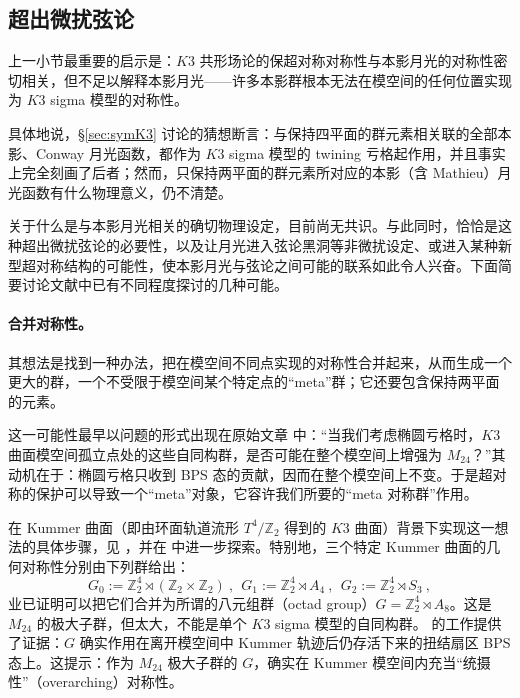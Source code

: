 \documentclass[11pt,a4paper,fontset=windows]{ctexart}
\numberwithin{equation}{section}
\newcommand{\myparagraph}[1]{\paragraph{#1}\mbox\\}
\newcommand{\ZZ}{\mathbb{Z}}
\begin{document}

\subsection{超出微扰弦论}
\label{subsec:phys_Other directions}

上一小节最重要的启示是：$K3$ 共形场论的保超对称对称性与本影月光的对称性密切相关，但不足以解释本影月光——许多本影群根本无法在模空间的任何位置实现为 $K3$ sigma 模型的对称性。

具体地说，\S\ref{sec:symK3} 讨论的猜想断言：与保持四平面的群元素相关联的全部本影、Conway 月光函数，都作为 $K3$ sigma 模型的 twining 亏格起作用，并且事实上完全刻画了后者；然而，只保持两平面的群元素所对应的本影（含 Mathieu）月光函数有什么物理意义，仍不清楚。


关于什么是与本影月光相关的确切物理设定，目前尚无共识。与此同时，恰恰是这种超出微扰弦论的必要性，以及让月光进入弦论黑洞等非微扰设定、或进入某种新型超对称结构的可能性，使本影月光与弦论之间可能的联系如此令人兴奋。下面简要讨论文献中已有不同程度探讨的几种可能。

\myparagraph{合并对称性。} 其想法是找到一种办法，把在模空间不同点实现的对称性合并起来，从而生成一个更大的群，一个不受限于模空间某个特定点的“meta”群；它还要包含保持两平面的元素。

这一可能性最早以问题的形式出现在原始文章 \cite{Eguchi2010} 中：“当我们考虑椭圆亏格时，$K3$ 曲面模空间孤立点处的这些自同构群，是否可能在整个模空间上增强为 $M_{24}$？”其动机在于：椭圆亏格只收到 BPS 态的贡献，因而在整个模空间上不变。于是超对称的保护可以导致一个“meta”对象，它容许我们所要的“meta 对称群”作用。


在 Kummer 曲面（即由环面轨道流形 $T^4/\ZZ_2$ 得到的 $K3$ 曲面）背景下实现这一想法的具体步骤，见 \cite{Taormina:2011rr,Taormina:2013mda,cheng2015landau}，并在 \cite{GaberdielMatthiasR2017Mmas} 中进一步探索。特别地，三个特定 Kummer 曲面的几何对称性分别由下列群给出：
\begin{equation}
G_0:=\ZZ_2^4\rtimes(\ZZ_2\times\ZZ_2)~,~~G_1:=\ZZ_2^4\rtimes A_4~,~~G_2:=\ZZ_2^4\rtimes S_3~, 
\end{equation}
业已证明可以把它们合并为所谓的八元组群（octad group）$G=\ZZ_2^4\rtimes A_8$。这是 $M_{24}$ 的极大子群，但太大，不能是单个 $K3$ sigma 模型的自同构群。\cite{GaberdielMatthiasR2017Mmas} 的工作提供了证据：$G$ 确实作用在离开模空间中 Kummer 轨迹后仍存活下来的扭结扇区 BPS 态上。这提示：作为 $M_{24}$ 极大子群的 $G$，确实在 Kummer 模空间内充当“统摄性”（overarching）对称性。
\end{document}
